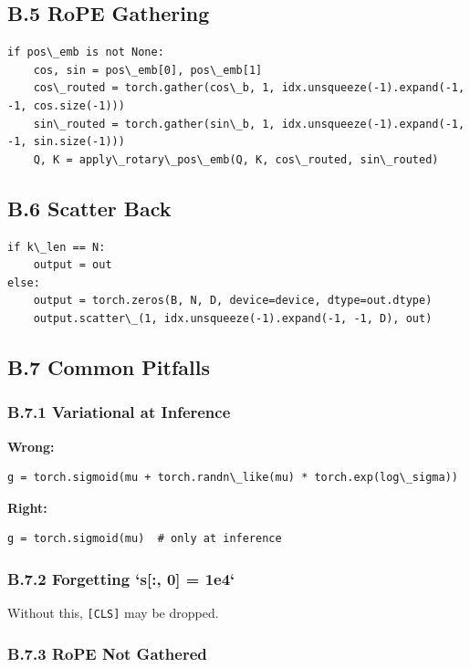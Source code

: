 \subsection{B.5 RoPE Gathering}

\begin{lstlisting}
if pos\_emb is not None:
    cos, sin = pos\_emb[0], pos\_emb[1]
    cos\_routed = torch.gather(cos\_b, 1, idx.unsqueeze(-1).expand(-1, -1, cos.size(-1)))
    sin\_routed = torch.gather(sin\_b, 1, idx.unsqueeze(-1).expand(-1, -1, sin.size(-1)))
    Q, K = apply\_rotary\_pos\_emb(Q, K, cos\_routed, sin\_routed)
\end{lstlisting}

\subsection{B.6 Scatter Back}

\begin{lstlisting}
if k\_len == N:
    output = out
else:
    output = torch.zeros(B, N, D, device=device, dtype=out.dtype)
    output.scatter\_(1, idx.unsqueeze(-1).expand(-1, -1, D), out)
\end{lstlisting}

\subsection{B.7 Common Pitfalls}

\subsubsection{B.7.1 Variational at Inference}

\textbf{Wrong:}
\begin{lstlisting}
g = torch.sigmoid(mu + torch.randn\_like(mu) * torch.exp(log\_sigma))
\end{lstlisting}

\textbf{Right:}
\begin{lstlisting}
g = torch.sigmoid(mu)  # only at inference
\end{lstlisting}

\subsubsection{B.7.2 Forgetting `s[:, 0] = 1e4`}

Without this, \texttt{[CLS]} may be dropped.

\subsubsection{B.7.3 RoPE Not Gathered}

